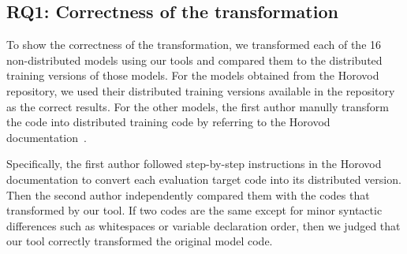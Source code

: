 \subsection{RQ1: Correctness of the transformation}
To show the correctness of the transformation, we transformed each of the 16
non-distributed models using our tools and compared them to the distributed training
versions of those models.
For the models obtained from the Horovod repository, we used their distributed
training versions available in the repository as the correct results.
For the other models, the first author manully transform the code into
distributed training code by referring to the Horovod documentation~\cite{hvd-docs}.
\begin{inred}
Specifically, the first author followed step-by-step instructions in the Horovod documentation
to convert each evaluation target code into its distributed version.
Then the second author independently compared them with the codes that transformed
by our tool. 
If two codes are the same except for minor syntactic differences such as
whitespaces or variable declaration order,
then we judged that our tool correctly transformed the original model code.

\end{inred}



